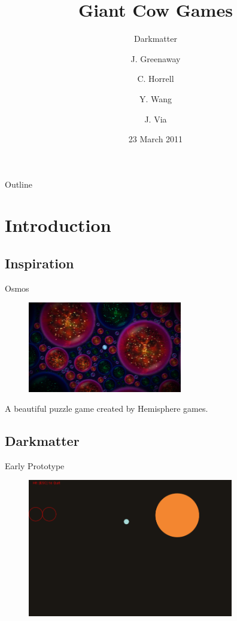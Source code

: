 \documentclass[]{beamer}
\title[]{Giant Cow Games}
\subtitle{Darkmatter}
\author[]{J. Greenaway \and C. Horrell \and Y. Wang \and J. Via}
\date[]{23 March 2011}
\begin{document}
\begin{frame}
  \titlepage
\end{frame}

\begin{frame}{Outline}
  \small\tableofcontents
\end{frame}



\section{Introduction}

\subsection{Inspiration}
\begin{frame}{Osmos}
  \begin{figure}
    \includegraphics[width=0.6\textwidth]{img/osmos.png}
  \end{figure}
  \begin{block}{}
    A beautiful puzzle game created by Hemisphere games.
  \end{block}
\end{frame}


\subsection{Darkmatter}
\begin{frame}{Early Prototype}
  \begin{figure}
    \includegraphics[width=0.8\textwidth]{img/prototype.png}
  \end{figure}
\end{frame}
\end{document}
